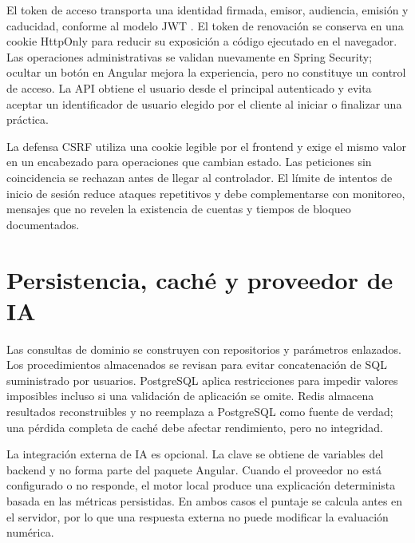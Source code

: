 \documentclass[11pt,a4paper]{report}
\begin{document}
El token de acceso transporta una identidad firmada, emisor, audiencia, emisión y
caducidad, conforme al modelo JWT \cite{rfc7519}. El token de renovación se conserva
en una cookie HttpOnly para reducir su exposición a código ejecutado en el navegador.
Las operaciones administrativas se validan nuevamente en Spring Security; ocultar un
botón en Angular mejora la experiencia, pero no constituye un control de acceso. La
API obtiene el usuario desde el principal autenticado y evita aceptar un identificador
de usuario elegido por el cliente al iniciar o finalizar una práctica.

La defensa CSRF utiliza una cookie legible por el frontend y exige el mismo valor en
un encabezado para operaciones que cambian estado. Las peticiones sin coincidencia se
rechazan antes de llegar al controlador. El límite de intentos de inicio de sesión
reduce ataques repetitivos y debe complementarse con monitoreo, mensajes que no
revelen la existencia de cuentas y tiempos de bloqueo documentados.

\section{Persistencia, caché y proveedor de IA}

Las consultas de dominio se construyen con repositorios y parámetros enlazados. Los
procedimientos almacenados se revisan para evitar concatenación de SQL suministrado
por usuarios. PostgreSQL aplica restricciones para impedir valores imposibles incluso
si una validación de aplicación se omite. Redis almacena resultados reconstruibles y
no reemplaza a PostgreSQL como fuente de verdad; una pérdida completa de caché debe
afectar rendimiento, pero no integridad.

La integración externa de IA es opcional. La clave se obtiene de variables del
backend y no forma parte del paquete Angular. Cuando el proveedor no está configurado
o no responde, el motor local produce una explicación determinista basada en las
métricas persistidas. En ambos casos el puntaje se calcula antes en el servidor, por
lo que una respuesta externa no puede modificar la evaluación numérica.
\end{document}
